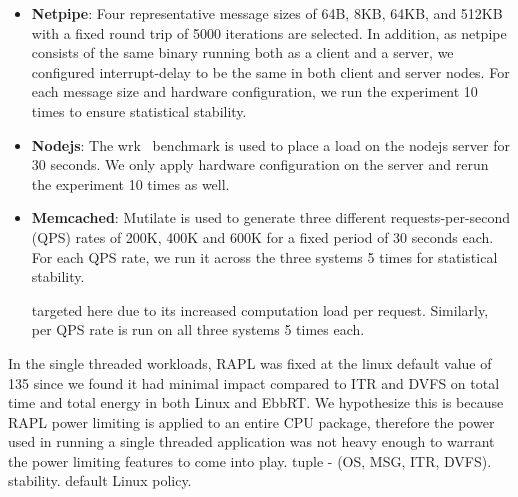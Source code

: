 \begin{itemize}
\item \textbf{Netpipe}: Four representative message sizes of 64B, 8KB, 64KB,
and 512KB with a fixed round trip of 5000 iterations are selected. In addition,
as netpipe consists of the same binary running both as a client and a server,
we configured interrupt-delay to be the same in both client and server nodes.
For each message size and hardware configuration, we run the experiment 10
times to ensure statistical stability.
    
\item \textbf{Nodejs}: The wrk~\cite{wrk} benchmark is used to place a load on
the nodejs server for 30 seconds. We only apply hardware configuration on the
server and rerun the experiment 10 times as well.
    
\item \textbf{Memcached}: Mutilate is used to generate three different
requests-per-second (QPS) rates of 200K, 400K and 600K for a fixed period of 30
seconds each. For each QPS rate, we run it across the three systems 5 times for
statistical stability.
    
targeted here due to its increased computation load per request. Similarly, per
QPS rate is run on all three systems 5 times each.
\end{itemize}



In the single threaded workloads, RAPL was fixed at the linux default value of
135 \watt since we found it had minimal impact compared to ITR and DVFS on
total time and total energy in both Linux and EbbRT. We hypothesize this is
because RAPL power limiting is applied to an entire CPU package, therefore the
power used in running a single threaded application was not heavy enough to
warrant the power limiting features to come into play.
tuple - (OS, MSG, ITR, DVFS).
stability.
default Linux policy.
    
